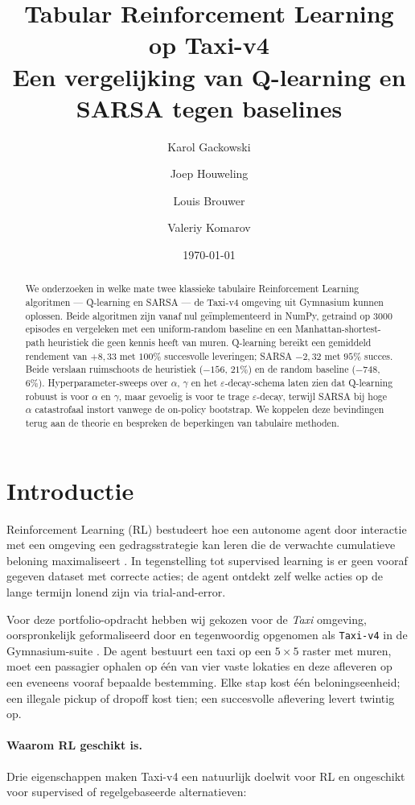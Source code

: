 \documentclass[11pt,a4paper]{article}
\title{\textbf{Tabular Reinforcement Learning op Taxi-v4} \\
       \large Een vergelijking van Q-learning en SARSA tegen baselines}
\author{Karol Gackowski \and Joep Houweling \and Louis Brouwer \and Valeriy Komarov}\date{\today}
\begin{document}
\maketitle

\begin{abstract}
\noindent
We onderzoeken in welke mate twee klassieke tabulaire Reinforcement
Learning algoritmen --- Q-learning en SARSA --- de Taxi-v4 omgeving uit
Gymnasium kunnen oplossen. Beide algoritmen zijn vanaf nul ge\"implementeerd
in NumPy, getraind op 3000 episodes en vergeleken met een uniform-random
baseline en een Manhattan-shortest-path heuristiek die geen kennis heeft
van muren. Q-learning bereikt een gemiddeld rendement van $+8{,}33$ met
$100\%$ succesvolle leveringen; SARSA $-2{,}32$ met $95\%$ succes. Beide
verslaan ruimschoots de heuristiek ($-156$, $21\%$) en de random baseline
($-748$, $6\%$). Hyperparameter-sweeps over $\alpha$, $\gamma$ en het
$\varepsilon$-decay-schema laten zien dat Q-learning robuust is voor
$\alpha$ en $\gamma$, maar gevoelig is voor te trage $\varepsilon$-decay,
terwijl SARSA bij hoge $\alpha$ catastrofaal instort vanwege de
on-policy bootstrap. We koppelen deze bevindingen terug aan de theorie en
bespreken de beperkingen van tabulaire methoden.
\end{abstract}

\section{Introductie}

Reinforcement Learning (RL) bestudeert hoe een autonome agent door
interactie met een omgeving een gedragsstrategie kan leren die de
verwachte cumulatieve beloning maximaliseert
\cite{sutton_barto_2018}. In tegenstelling tot supervised learning is er
geen vooraf gegeven dataset met correcte acties; de agent ontdekt zelf
welke acties op de lange termijn lonend zijn via trial-and-error.

Voor deze portfolio-opdracht hebben wij gekozen voor de \emph{Taxi}
omgeving, oorspronkelijk geformaliseerd door
\citet{dietterich_2000} en tegenwoordig opgenomen als
\texttt{Taxi-v4} in de Gymnasium-suite \cite{towers_2024}. De agent
bestuurt een taxi op een $5 \times 5$ raster met muren, moet een
passagier ophalen op \'e\'en van vier vaste lokaties en deze afleveren op
een eveneens vooraf bepaalde bestemming. Elke stap kost \'e\'en
beloningseenheid; een illegale pickup of dropoff kost tien; een
succesvolle aflevering levert twintig op.

\paragraph{Waarom RL geschikt is.}
Drie eigenschappen maken Taxi-v4 een natuurlijk doelwit voor RL en
ongeschikt voor supervised of regelgebaseerde alternatieven:
\end{document}
